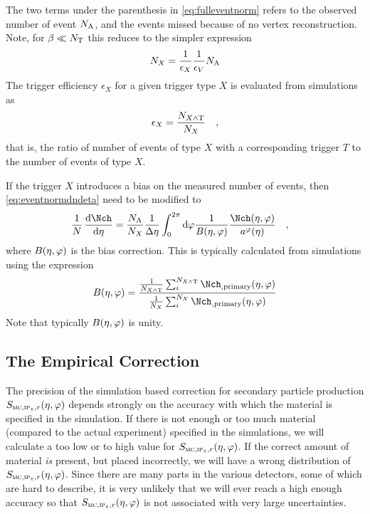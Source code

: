 \documentclass[compat,11pt]{alicenote}
\newcommand\mult[1][]{\Nch\ifx|#1|\relax\else_{#1}\fi}
\newcommand*{\etaphi}{\ensuremath(\eta,\varphi)}
\newcommand{\N}[2]{{\ensuremath N_{#1#2}}}
\newcommand*{\NT}{\N{\text{T}}{}}
\renewcommand{\NA}{\N{\text{A}}{}}
\newcommand*\SecMap{\ensuremath S_{\subMC,\subIPz,r}\etaphi}
\newcommand{\dndetadphi}[1][]{{\ensuremath%
    \ifx|#1|\else\left.\fi%
      \Nch\etaphi%
      \ifx|#1|\else\right|_{#1}\fi}}
\newcommand{\PhiAcc}{\ensuremath a^{\varphi}(\eta)}
\begin{document}
The two terms under the parenthesis in \eqref{eq:fulleventnorm} refers
to the observed number of event $\NA$, and the events missed because
of no vertex reconstruction.  Note, for $\beta\ll\NT{}$
this reduces to the simpler expression
$$
\N{X}{} = \frac1{\epsilon_X}\frac1{\epsilon_V}\NA{}
$$
The trigger efficiency $\epsilon_X$ for a given trigger type $X$ is
evaluated from simulations as
\begin{align*}
  \epsilon_X = \frac{\N{X\wedge \text{T}}{}}{\N{X}{}}\quad,
\end{align*}
that is, the ratio of number of events of type $X$ with a
corresponding trigger $T$ to the number of events of type $X$.

If the trigger $X$ introduces a bias on the measured number of events,
then \eqref{eq:eventnormdndeta} need to be modified to 
\begin{align}
  \ndndeta &= 
  \frac{\NA}{\N{X}{}}\frac1{\Delta\eta} \int_0^{2\pi} \text{d}\varphi
  \frac{1}{B\etaphi}\frac{\dndetadphi}{\PhiAcc}
  \label{eq:eventnormdndeta2}\quad,
\end{align}
where $B\etaphi$ is the bias correction.  This is typically
calculated from simulations using the expression 
\begin{align*}
  B\etaphi = \frac{\frac{1}{\N{X\wedge \text{T}}{}}\sum_i^{\N{X\wedge
        \text{T}}{}}
    \mult[,\text{primary}]\etaphi}{\frac{1}{\N{X}{}}\sum_i^{\N{X}{}}
    \mult[,\text{primary}]\etaphi}
\end{align*}
Note that typically $B\etaphi$ is unity.

\subsection{The Empirical Correction} 
\label{sec:sub:empirical} 

The precision of the simulation based correction for secondary
particle production $\SecMap{}$ depends strongly on the accuracy with
which the material is specified in the simulation.  If there is not
enough or too much material (compared to the actual experiment)
specified in the simulations, we will calculate a too low or to high
value for $\SecMap$.  If the correct amount of material \emph{is}
present, but placed incorrectly, we will have a wrong distribution of
$\SecMap$.  Since there are many parts in the various detectors, some
of which are hard to describe, it is very unlikely that we will ever
reach a high enough accuracy so that $\SecMap$ is not associated with
very large uncertainties.
\end{document}
